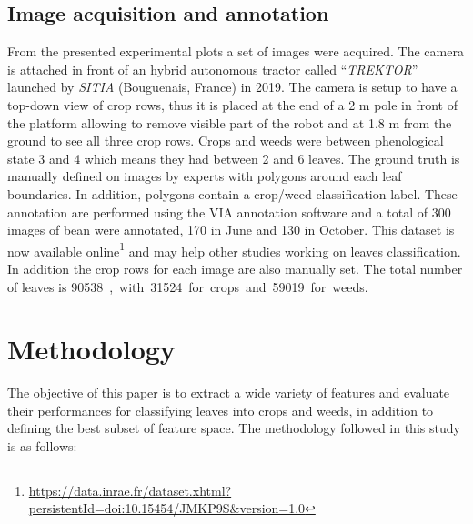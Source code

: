\documentclass[../thesis.tex]{subfiles}
\begin{document}
    
    \subsection{Image acquisition and annotation}
    
    From the presented experimental plots a set of images were acquired. The camera is attached in front of an hybrid autonomous tractor called ``\textit{TREKTOR}'' launched by \textit{SITIA} (Bouguenais, France) in 2019. The camera is setup to have a top-down view of crop rows, thus it is placed at the end of a 2 m pole in front of the platform allowing to remove visible part of the robot and at 1.8 m from the ground to see all three crop rows. Crops and weeds were between phenological state 3 and 4 which means they had between 2 and 6 leaves. The ground truth is manually defined on images by experts with polygons around each leaf boundaries. In addition, polygons contain a crop/weed classification label. These annotation are performed using the VIA annotation software \cite{dutta2019vgg} and a total of 300 images of bean were annotated, 170 in June and 130 in October. This dataset is now available online\footnote{\url{https://data.inrae.fr/dataset.xhtml?persistentId=doi:10.15454/JMKP9S&version=1.0}} and may help other studies working on leaves classification. In addition the crop rows for each image are also manually set. The total number of leaves is \SI{90538}, with \SI{31524} for crops and \SI{59019} for weeds.
    
    \section{Methodology}
    
    The objective of this paper is to extract a wide variety of features and evaluate their performances for classifying leaves into crops and weeds, in addition to defining the best subset of feature space. The methodology followed in this study is as follows:
    
\end{document}
